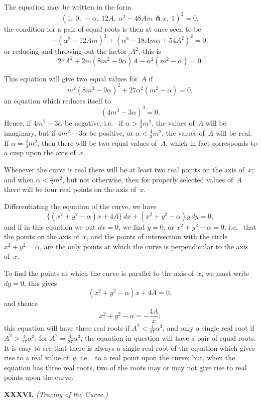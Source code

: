 \documentclass[12pt,a4paper]{article}
\theoremstyle{definition}
\newcommand{\ie}{i.e.\ }
\begin{document}
The equation may be written in the form
\[
(1,\ 0,\ -\alpha,\ 12A,\ \alpha^{2} - 48Am \pitchfork x,\ 1)^{2} = 0,
\]
the condition for a pair of equal roots is then at once seen to be
\[
-(\alpha^{2} - 12Am)^{3} + (\alpha^{3} - 18A m \alpha + 54A^{2})^{2} = 0;
\]
or reducing and throwing out the factor~$A^{2}$,
this is
\[
27A^{2} + 2m(8m^{2} - 9\alpha)A - \alpha^{2}(m^{2} - \alpha) = 0.
\]

This equation will give two equal values for~$A$ if
\[
m^{2}(8m^{2} - 9\alpha)^{2} + 27\alpha^{2}(m^{2} - \alpha) = 0,
\]
an equation which reduces itself to
\[
(4m^{2} - 3\alpha)^{3} = 0.
\]
Hence, if $4m^{2} - 3\alpha$ be negative, \ie{} if $\alpha > \tfrac{4}{3}m^{2}$,
the values of~$A$ will be imaginary, but if $4m^{2} - 3\alpha$ be positive,
or $\alpha < \tfrac{4}{3}m^{2}$, the values of~$A$ will be real.
If $\alpha = \tfrac{4}{3}m^{2}$, then there will be two equal values of~$A$,
which in fact corresponds to a cusp upon the axis of~$x$.

Whenever the curve is real there will be at least two real
points on the axis of~$x$; and when $\alpha < \tfrac{4}{3}m^{2}$, but not
otherwise, then for properly selected values of~$A$ there will be
four real points on the axis of~$x$.

Differentiating the equation of the curve, we have
\[
\{ (x^{2} + y^{2} - \alpha)x + 4A \}\, dx + (x^{2} + y^{2} - \alpha)y\, dy = 0;
\]
and if in this equation we put $dx = 0$, we find $y = 0$,
or $x^{2} + y^{2} - \alpha = 0$, \ie{} that the points on the axis of~$x$,
and the points of intersection with the circle $x^{2} + y^{2} = \alpha$,
are the only points at which the curve is perpendicular to the axis of~$x$.

To find the points at which the curve is parallel to the axis of~$x$,
we must write $dy = 0$, this gives
\[
(x^{2} + y^{2} - \alpha)x + 4A = 0,
\]
and thence
\[
x^{2} + y^{2} - \alpha = - \frac{4A}{x};
\]
this equation will have three real roots if $A^{2} < \tfrac{4}{27}\alpha^{3}$,
and only a single real root if $A^{2} > \tfrac{4}{27}\alpha^{3}$;
for $A^{2} = \tfrac{4}{27}\alpha^{3}$, the equation in question will have
a pair of equal roots.
It is easy to see that there is always a single real root of
the equation which gives rise to a real value of~$y$, \ie{} to a
real point upon the curve; but, when the equation has three
real roots, two of the roots may or may not give rise to real
points upon the curve.

\medskip\noindent\textbf{XXXVI.}
\textit{(Tracing of the Curve.)}
\end{document}
